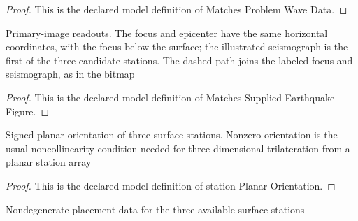 \begin{proof}
  This is the declared model definition of Matches Problem Wave Data.
\end{proof}
\begin{definition}
  \label{def:physics:phyx-mini-0239:phyxminiproblems-problemphyxmini0239-matchessuppliedearthquakefigure}
  Primary-image readouts. The focus and epicenter have the same horizontal coordinates, with the focus below the surface; the illustrated seismograph is the first of the three candidate stations. The dashed path joins the labeled focus and seismograph, as in the bitmap
\end{definition}
\begin{proof}
  This is the declared model definition of Matches Supplied Earthquake Figure.
\end{proof}
\begin{definition}
  \label{def:physics:phyx-mini-0239:phyxminiproblems-problemphyxmini0239-stationplanarorientation}
  Signed planar orientation of three surface stations. Nonzero orientation is the usual noncollinearity condition needed for three-dimensional trilateration from a planar station array
\end{definition}
\begin{proof}
  This is the declared model definition of station Planar Orientation.
\end{proof}
\begin{definition}
  \label{def:physics:phyx-mini-0239:phyxminiproblems-problemphyxmini0239-hasnondegeneratestationgeometry}
  Nondegenerate placement data for the three available surface stations
\end{definition}
